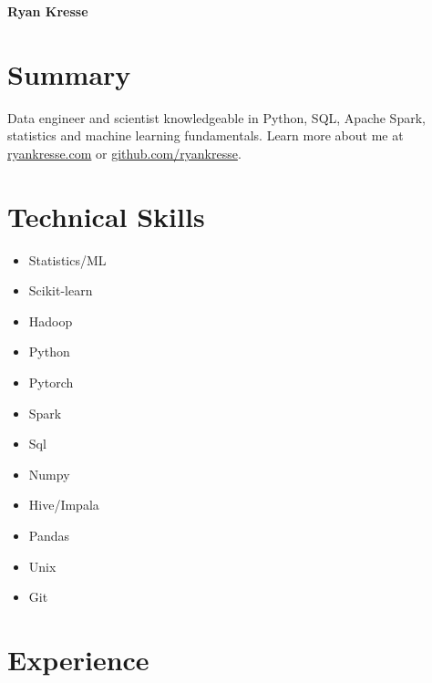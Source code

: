 \documentclass[11pt]{article}
\begin{document}
	\noindent \textbf{{\fontsize{38pt}{\parskip}\selectfont \color{RyanRed} Ryan Kresse}}
	\smallskip


	\section{Summary}
	Data engineer and scientist knowledgeable in Python, SQL, Apache Spark, statistics and machine learning fundamentals. Learn more about me at \href{http://ryankresse.com/blog}{ryankresse.com} or \href{https://github.com/ryankresse}{github.com/ryankresse}.
	\section{Technical Skills}
		\begin{multicols}{4}
				\begin{itemize}
				\item Statistics/ML
				\item Scikit-learn
				\item Hadoop

				\columnbreak
				\item Python
				\item Pytorch
				\item Spark

				\columnbreak
				\item Sql
				\item Numpy
				\item Hive/Impala

				\columnbreak
				\item Pandas
				\item Unix
				\item Git
				\columnbreak

			\end{itemize}
		\end{multicols}



	\section{Experience}
\end{document}
